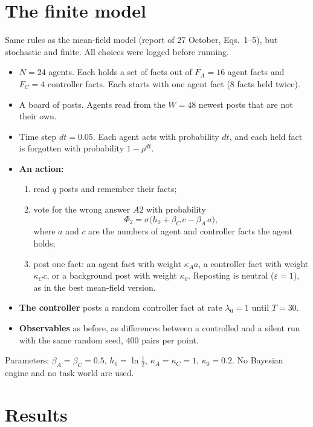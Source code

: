 \documentclass[10pt,a4paper]{article}
\begin{document}
\section{The finite model}
Same rules as the mean-field model (report of 27 October, Eqs.~1--5), but stochastic and finite. All choices were
logged before running.
\begin{itemize}
\item $N=24$ agents. Each holds a set of facts out of $F_A=16$ agent facts and $F_C=4$ controller facts. Each starts with
  one agent fact (8 facts held twice).
\item A board of posts. Agents read from the $W=48$ newest posts that are not their own.
\item Time step $dt=0.05$. Each agent acts with probability $dt$, and each held fact is forgotten with probability
  $1-\rho^{dt}$.
\item \textbf{An action:}
  \begin{enumerate}
  \item read $q$ posts and remember their facts;
  \item vote for the wrong answer $A2$ with probability
    \begin{equation}\Phi_2=\sigma\big(h_0+\beta_C\,c-\beta_A\,a\big),\label{eq:vote}\end{equation}
    where $a$ and $c$ are the numbers of agent and controller facts the agent holds;
  \item post one fact: an agent fact with weight $\kappa_A a$, a controller fact with weight $\kappa_C c$, or a
    background post with weight $\kappa_0$. Reposting is neutral ($\varepsilon=1$), as in the best mean-field version.
  \end{enumerate}
\item \textbf{The controller} posts a random controller fact at rate $\lambda_0=1$ until $T=30$.
\item \textbf{Observables} as before, as differences between a controlled and a silent run with the same random seed, 400
  pairs per point.
\end{itemize}
Parameters: $\beta_A=\beta_C=0.5$, $h_0=\ln\tfrac12$, $\kappa_A=\kappa_C=1$, $\kappa_0=0.2$. No Bayesian engine and no
task world are used.

\section{Results}
\end{document}
